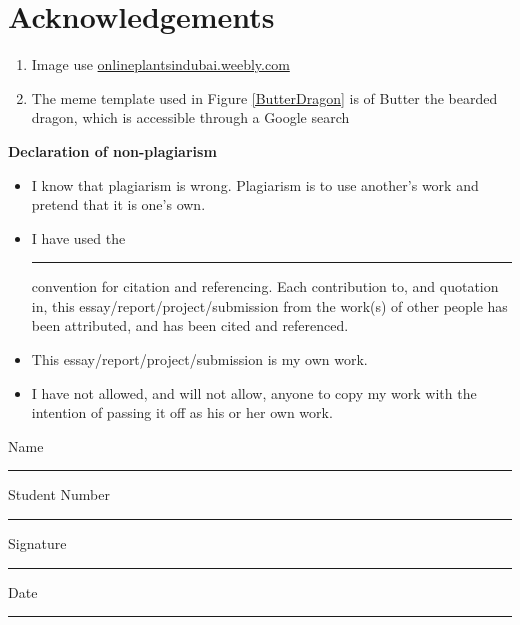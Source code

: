\chapter{Acknowledgements}
\begin{enumerate}
    \item Image use \href{https://onlineplantsindubai.weebly.com/uploads/1/0/9/0/109064913/air-plants-terrarium-as-bearded-dragon-terrarium_1_orig.jpg}{onlineplantsindubai.weebly.com}
    \item The meme template used in Figure \ref{ButterDragon} is of Butter the bearded dragon, which is accessible through a Google search
\end{enumerate}

\newpage

\textbf{Declaration of non-plagiarism}

\begin{itemize}
    \item I know that plagiarism is wrong. Plagiarism is to use another’s work and pretend that it is one’s own.
    \item I have used the \rule{4cm}{1pt} convention for citation and referencing. Each contribution to, and quotation in, this essay/report/project/submission from the work(s) of other people has been attributed, and has been cited and referenced.
    \item This essay/report/project/submission is my own work.

    \item I have not allowed, and will not allow, anyone to copy my work with the intention of passing it off as his or her own work. 

\end{itemize}

 

Name \rule{4cm}{1pt}  Student Number \rule{4cm}{1pt}

 

Signature \rule{4cm}{1pt}     Date \rule{4cm}{1pt}

 
